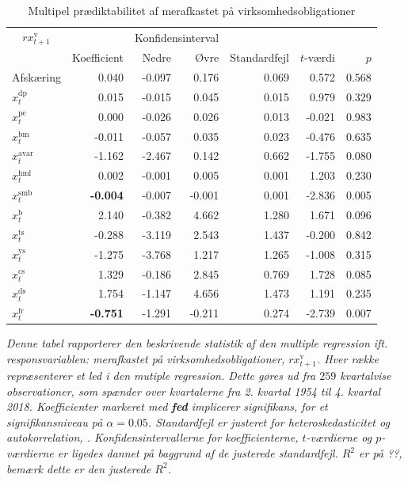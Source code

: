 \documentclass[
  a4paper,
  oneside]{memoir}
\begin{document}
\begin{table}[H]

\caption{\label{tab:MULT-v}Multipel prædiktabilitet af merafkastet på virksomhedsobligationer}
\centering
\begin{threeparttable}
\begin{tabular}[t]{lrrrrrr}
\toprule
\multicolumn{1}{c}{$rx_{t+1}^{\text{v}}$} & \multicolumn{1}{c}{ } & \multicolumn{2}{c}{Konfidensinterval} & \multicolumn{3}{c}{ } \\
\cmidrule(l{3pt}r{3pt}){1-1} \cmidrule(l{3pt}r{3pt}){3-4}
  & Koefficient & Nedre & Øvre & Standardfejl & $t$-værdi & $p$\\
\midrule
\rowcolor{gray!6}  Afskæring & 0.040 & -0.097 & 0.176 & 0.069 & 0.572 & 0.568\\
$x_t^{\text{dp}}$ & 0.015 & -0.015 & 0.045 & 0.015 & 0.979 & 0.329\\
\rowcolor{gray!6}  $x_t^{\text{pe}}$ & 0.000 & -0.026 & 0.026 & 0.013 & -0.021 & 0.983\\
$x_t^{\text{bm}}$ & -0.011 & -0.057 & 0.035 & 0.023 & -0.476 & 0.635\\
\rowcolor{gray!6}  $x_t^{\text{avar}}$ & -1.162 & -2.467 & 0.142 & 0.662 & -1.755 & 0.080\\
$x_t^{\text{hml}}$ & 0.002 & -0.001 & 0.005 & 0.001 & 1.203 & 0.230\\
\rowcolor{gray!6}  $x_t^{\text{smb}}$ & \textbf{-0.004} & -0.007 & -0.001 & 0.001 & -2.836 & 0.005\\
$x_t^{\text{b}}$ & 2.140 & -0.382 & 4.662 & 1.280 & 1.671 & 0.096\\
\rowcolor{gray!6}  $x_t^{\text{ts}}$ & -0.288 & -3.119 & 2.543 & 1.437 & -0.200 & 0.842\\
$x_t^{\text{ys}}$ & -1.275 & -3.768 & 1.217 & 1.265 & -1.008 & 0.315\\
\rowcolor{gray!6}  $x_t^{\text{cs}}$ & 1.329 & -0.186 & 2.845 & 0.769 & 1.728 & 0.085\\
$x_t^{\text{ds}}$ & 1.754 & -1.147 & 4.656 & 1.473 & 1.191 & 0.235\\
\rowcolor{gray!6}  $x_t^{\text{fr}}$ & \textbf{-0.751} & -1.291 & -0.211 & 0.274 & -2.739 & 0.007\\
\bottomrule
\end{tabular}
\begin{tablenotes}
\item \textit{Denne tabel rapporterer den beskrivende statistik af den multiple regression ift. responsvariablen: merafkastet på virksomhedsobligationer, $rx_{t+1}^{\text{v}}$. Hver række repræsenterer et led i den mutiple regression. Dette gøres ud fra $259$ kvartalvise observationer, som spænder over kvartalerne fra 2. kvartal 1954 til 4. kvartal 2018. Koefficienter markeret med \textbf{fed} implicerer signifikans, for et signifikansniveau på $\alpha=0.05$. Standardfejl er justeret for heteroskedasticitet og autokorrelation, \citep{Newey1987}. Konfidensintervallerne for koefficienterne, $t$-værdierne og $p$-værdierne er ligedes dannet på baggrund af de justerede standardfejl. $R^2$ er på ??, bemærk dette er den justerede $R^2$.}
\end{tablenotes}
\end{threeparttable}
\end{table}
\end{document}
